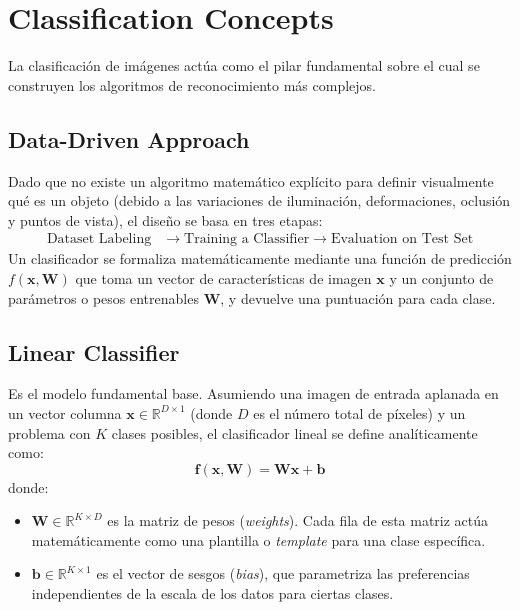 \section{Classification Concepts}
\noindent
La clasificación de imágenes actúa como el pilar fundamental sobre el cual se construyen los algoritmos de reconocimiento más complejos. 

\subsection{Data-Driven Approach}
\noindent
Dado que no existe un algoritmo matemático explícito para definir visualmente qué es un objeto (debido a las variaciones de iluminación, deformaciones, oclusión y puntos de vista), el diseño se basa en tres etapas:
\begin{align*}
    \text{Dataset Labeling} &\longrightarrow \text{Training a Classifier} \longrightarrow \text{Evaluation on Test Set}
\end{align*}
Un clasificador se formaliza matemáticamente mediante una función de predicción $f(\mathbf{x}, \mathbf{W})$ que toma un vector de características de imagen $\mathbf{x}$ y un conjunto de parámetros o pesos entrenables $\mathbf{W}$, y devuelve una puntuación para cada clase.

\subsection{Linear Classifier}
\noindent
Es el modelo fundamental base. Asumiendo una imagen de entrada aplanada en un vector columna $\mathbf{x} \in \mathbb{R}^{D \times 1}$ (donde $D$ es el número total de píxeles) y un problema con $K$ clases posibles, el clasificador lineal se define analíticamente como:
\begin{equation}
    \mathbf{f}(\mathbf{x}, \mathbf{W}) = \mathbf{W}\mathbf{x} + \mathbf{b}
\end{equation}
donde:
\begin{itemize}
    \item $\mathbf{W} \in \mathbb{R}^{K \times D}$ es la matriz de pesos (\textit{weights}). Cada fila de esta matriz actúa matemáticamente como una plantilla o \textit{template} para una clase específica.
    \item $\mathbf{b} \in \mathbb{R}^{K \times 1}$ es el vector de sesgos (\textit{bias}), que parametriza las preferencias independientes de la escala de los datos para ciertas clases.
\end{itemize}

